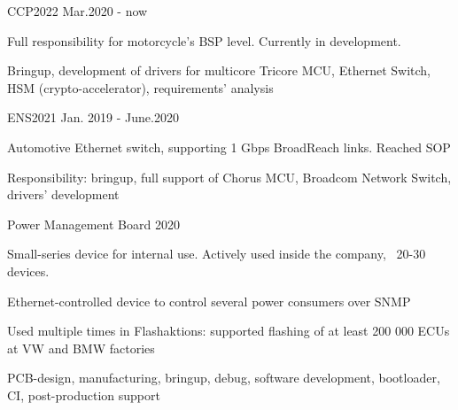 


\begin{cventries}


\cventry
{} %
{CCP2022} %
{} %
{Mar.2020 - now} %
{ %
\begin{cvitems}
\item {Full responsibility for motorcycle's BSP level. Currently in development.}
\item {Bringup, development of drivers for multicore Tricore MCU, Ethernet Switch, HSM (crypto-accelerator), requirements' analysis}
\end{cvitems}
}
\newline
\newline

\cventry
{} %
{ENS2021} %
{} %
{Jan. 2019 - June.2020} %
{ %
\begin{cvitems}
\item {Automotive Ethernet switch, supporting 1 Gbps BroadReach links. Reached SOP}
\item {Responsibility: bringup, full support of Chorus MCU, Broadcom Network Switch, drivers' development}
\end{cvitems}
}
\newline
\newline


\cventry
{} %
{Power Management Board} %
{} %
{2020} %
{ %
\begin{cvitems}
\item {Small-series device for internal use. Actively used inside the company, ~20-30 devices. }
\item {Ethernet-controlled device to control several power consumers over SNMP}
\item {Used multiple times in Flashaktions: supported flashing of at least 200 000 ECUs at VW and BMW factories}
\item {PCB-design, manufacturing, bringup, debug, software development, bootloader, CI, post-production support}
\end{cvitems}
}
\newline
\newline


\end{cventries}

